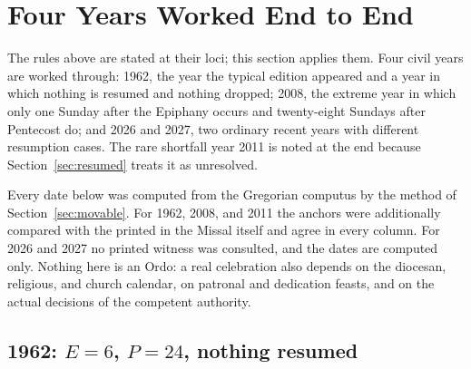 \section{Four Years Worked End to End}
\label{sec:years}

The rules above are stated at their loci; this section applies them. Four civil years are worked
through: 1962, the year the typical edition appeared and a year in which nothing is resumed and
nothing dropped; 2008, the extreme year in which only one Sunday after the Epiphany occurs and
twenty-eight Sundays after Pentecost do; and 2026 and 2027, two ordinary recent years with
different resumption cases. The rare shortfall year 2011 is noted at the end because
Section~\ref{sec:resumed} treats it as unresolved.

Every date below was computed from the Gregorian computus by the method of
Section~\ref{sec:movable}. For 1962, 2008, and 2011 the anchors were additionally compared with
the  printed in the Missal itself and agree in every column. For 2026
and 2027 no printed witness was consulted, and the dates are computed only. Nothing here is an
Ordo: a real celebration also depends on the diocesan, religious, and church calendar, on
patronal and dedication feasts, and on the actual decisions of the competent authority.

\subsection{1962: $E = 6$, $P = 24$, nothing resumed}

